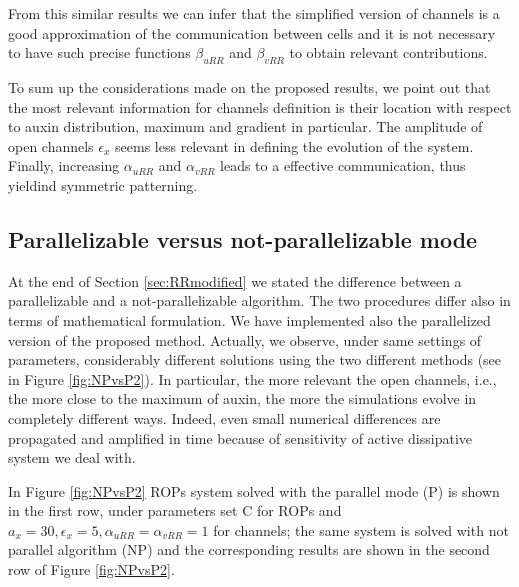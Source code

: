 From this similar results we can infer that the simplified version of channels is a good approximation of the communication between cells and it is not necessary to have such precise functions $\beta_{uRR}$ and $\beta_{vRR}$ to obtain relevant contributions.

To sum up the considerations made on the proposed results, we point out that the most relevant information for channels definition is their location with respect to auxin distribution, maximum and gradient in particular. The amplitude of open channels $\epsilon_x$ seems less relevant in defining the evolution of the system. Finally, increasing $\alpha_{uRR}$ and $\alpha_{vRR}$ leads to a effective communication, thus yieldind symmetric patterning.

\subsection{Parallelizable versus not-parallelizable mode}
At the end of Section \ref{sec:RRmodified} we stated the difference between a parallelizable and a not-parallelizable algorithm. The two procedures differ also in terms of mathematical formulation. We have implemented also the parallelized version of the proposed method. Actually, we observe, under same settings of parameters, considerably different solutions using the two different methods (see in Figure \ref{fig:NPvsP2}). In particular, the more relevant the open channels, i.e., the more close to the maximum of auxin, the more the simulations evolve in completely different ways. Indeed, even small numerical differences are propagated and amplified in time because of sensitivity of active dissipative system we deal with.

In Figure \ref{fig:NPvsP2} ROPs system solved with the parallel mode (P) is shown in the first row, under parameters set C for ROPs and $a_x = 30, \epsilon_x = 5, \alpha_{uRR} = \alpha_{vRR}= 1$ for channels; the same system is solved with not parallel algorithm (NP) and the corresponding results are shown in the second row of Figure \ref{fig:NPvsP2}.

